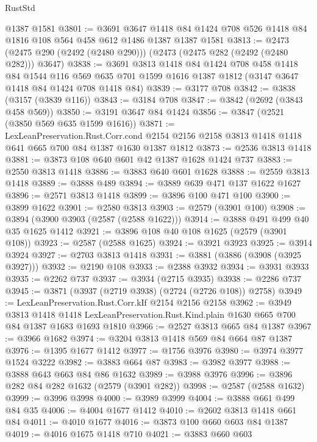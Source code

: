 \begin{lexlean}{RustStd}
\begin{coremodule}
{\begin{coremodule}
{{{{{{{{{{    @1387
    @1581
@3801 := @3691
    @3647
    @1418
    @84
    @1424
    @708
    @526
    @1418
    @84
    @1816
    @108
    @564
    @458
    @612
    @1486
    @1387
    @1387
    @1581
@3813 := @2473 (@2475 @290 (@2492 (@2480 @290))) (@2473 (@2475 @282 (@2492 (@2480 @282))) @3647)
@3838 := @3691
    @3813
    @1418
    @84
    @1424
    @708
    @458
    @1418
    @84
    @1544
    @116
    @569
    @635
    @701
    @1599
    @1616
    @1387
    @1812
    (@3147 @3647 @1418 @84 @1424 @708 @1418 @84)
@3839 := @3177 @708
@3842 := @3838 (@3157 (@3839 @116))
@3843 := @3184 @708
@3847 := @3842 (@2692 (@3843 @458 @569))
@3850 := @3191 @3647 @84 @1424
@3856 := @3847 (@2521 (@3850 @569 @635 @1599 @1616))
@3871 := LexLeanPreservation.Rust.Corr.cond
    @2154
    @2156
    @2158
    @3813
    @1418
    @1418
    @641
    @665
    @700
    @84
    @1387
    @1630
    @1387
    @1812
@3873 := @2536 @3813 @1418
@3881 := @3873 @108 @640 @601 @42 @1387 @1628 @1424 @737
@3883 := @2550 @3813 @1418
@3886 := @3883 @640 @601 @1628
@3888 := @2559 @3813 @1418
@3889 := @3888 @489
@3894 := @3889 @639 @471 @137 @1622 @1627
@3896 := @2571 @3813 @1418
@3899 := @3896 @100 @471 @100
@3900 := @3899 @1622
@3901 := @2580 @3813
@3903 := @2579 (@3901 @100)
@3908 := @3894 (@3900 @3903 (@2587 (@2588 @1622)))
@3914 := @3888 @491 @499 @40 @35 @1625 @1412
@3921 := @3896 @108 @40 @108 @1625 (@2579 (@3901 @108))
@3923 := @2587 (@2588 @1625)
@3924 := @3921 @3923
@3925 := @3914 @3924
@3927 := @2703 @3813 @1418
@3931 := @3881 (@3886 (@3908 (@3925 @3927)))
@3932 := @2190 @108
@3933 := @2388 @3932
@3934 := @3931 @3933
@3935 := @2262 @737
@3937 := @3934 (@2715 @3935)
@3938 := @2286 @737
@3945 := @3871 (@3937 (@2719 @3938) (@2724 (@2726 @108)) @2758)
@3949 := LexLeanPreservation.Rust.Corr.kIf @2154 @2156 @2158
@3962 := @3949
    @3813
    @1418
    @1418
    LexLeanPreservation.Rust.Kind.plain
    @1630
    @665
    @700
    @84
    @1387
    @1683
    @1693
    @1810
@3966 := @2527 @3813 @665 @84 @1387
@3967 := @3966 @1682
@3974 := @3204 @3813 @1418 @569 @84 @664 @87 @1387
@3976 := @1395 @1677 @1412
@3977 := @1756 @3976
@3980 := @3974 @3977 @1524 @3222
@3982 := @3883 @664 @87
@3983 := @3982 @3977
@3988 := @3888 @643 @663 @84 @86 @1632
@3989 := @3988 @3976
@3996 := @3896 @282 @84 @282 @1632 (@2579 (@3901 @282))
@3998 := @2587 (@2588 @1632)
@3999 := @3996 @3998
@4000 := @3989 @3999
@4004 := @3888 @661 @499 @84 @35
@4006 := @4004 @1677 @1412
@4010 := @2602 @3813 @1418 @661 @84
@4011 := @4010 @1677
@4016 := @3873 @100 @660 @603 @84 @1387
@4019 := @4016 @1675 @1418 @710
@4021 := @3883 @660 @603
}}}}}}}}}}
\end{coremodule}}
\end{coremodule}
\end{lexlean}
